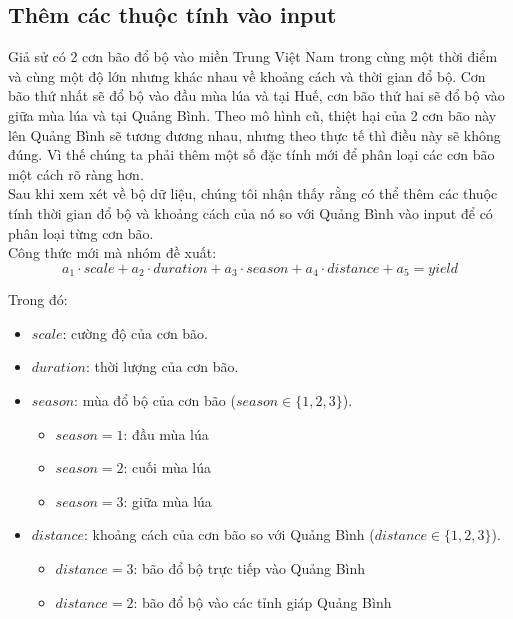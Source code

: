 \documentclass[12pt]{report}
\begin{document}
\subsection{Thêm các thuộc tính vào input} %
\label{ssub:thêm_các_thuộc_tính_vào_input}
\begin{flushleft}
	Giả sử có 2 cơn bão đổ bộ vào miền Trung Việt Nam trong cùng một thời điểm và cùng một độ lớn nhưng khác nhau về khoảng cách và thời gian đổ bộ. Cơn bão thứ nhất sẽ đổ bộ vào đầu mùa lúa và tại Huế, cơn bão thứ hai sẽ đổ bộ vào giữa mùa lúa và tại Quảng Bình. Theo mô hình cũ, thiệt hại của 2 cơn bão này lên Quảng Bình sẽ tương đương nhau, nhưng theo thực tế thì điều này sẽ không đúng. Vì thế chúng ta phải thêm một số đặc tính mới để phân loại các cơn bão một cách rõ ràng hơn.
	\\[\baselineskip]

	Sau khi xem xét về bộ dữ liệu, chúng tôi nhận thấy rằng có thể thêm các thuộc tính thời gian đổ bộ và khoảng cách của nó so với Quảng Bình vào input để có phân loại từng cơn bão.
	\\[\baselineskip]

	Công thức mới mà nhóm đề xuất:
	$$
		a_{1} \cdot {scale} + a_{2} \cdot {duration} + a_{3} \cdot {season} + a_{4} \cdot {distance} + a_{5} = yield
	$$

	Trong đó:
	\begin{itemize}
		\item $scale$: cường độ của cơn bão.

		\item $duration$: thời lượng của cơn bão.

		\item $season$: mùa đổ bộ của cơn bão ($season \in \{1, 2, 3\}$).
			\begin{itemize}
				\item $season = 1$: đầu mùa lúa

				\item $season = 2$: cuối mùa lúa

				\item $season = 3$: giữa mùa lúa
			\end{itemize}

		\item $distance$: khoảng cách của cơn bão so với Quảng Bình ($distance \in \{1, 2, 3\}$).
			\begin{itemize}
				\item $distance = 3$: bão đổ bộ trực tiếp vào Quảng Bình

				\item $distance = 2$: bão đổ bộ vào các tỉnh giáp Quảng Bình


\end{itemize}
\end{itemize}
\end{flushleft}
\end{document}
